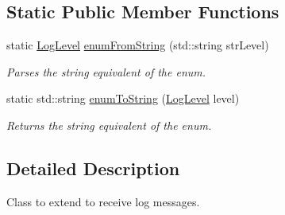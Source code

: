 \subsection*{Static Public Member Functions}
\begin{DoxyCompactItemize}
\item 
static \hyperlink{classBUSBOY_1_1Logger_ac674cbb789eaa29c338c66248a4e4234}{LogLevel} \hyperlink{classBUSBOY_1_1Logger_a6be1115b0616e3a68ef1a89d16d49828}{enumFromString} (std::string strLevel)
\begin{DoxyCompactList}\small\item\em Parses the string equivalent of the enum. \item\end{DoxyCompactList}\item 
static std::string \hyperlink{classBUSBOY_1_1Logger_ab12dfc555373bfa7ce21d274ab08a417}{enumToString} (\hyperlink{classBUSBOY_1_1Logger_ac674cbb789eaa29c338c66248a4e4234}{LogLevel} level)
\begin{DoxyCompactList}\small\item\em Returns the string equivalent of the enum. \item\end{DoxyCompactList}\end{DoxyCompactItemize}


\subsection{Detailed Description}
Class to extend to receive log messages. 

